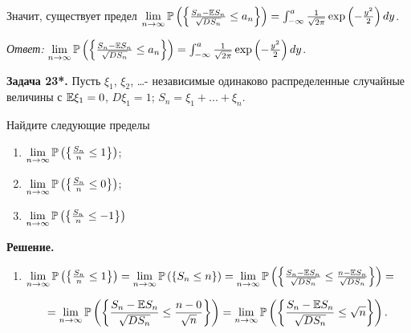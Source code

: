 Значит, существует предел $\mathop{\lim }\limits_{n\to \infty } {\rm {\mathbb P}}\left(\left\{\frac{S_{n} -{\rm {\mathbb E}}S_{n} }{\sqrt{DS_{n} } } \le a_{n} \right\}\right)=\int _{-\infty }^{a}{\tfrac{1}{\sqrt{2\pi } }} \exp \left(-{\tfrac{y^{2} }{2}} \right)dy $.

\textit{Ответ: }$\mathop{\lim }\limits_{n\to \infty } {\rm {\mathbb P}}\left(\left\{\frac{S_{n} -{\rm {\mathbb E}}S_{n} }{\sqrt{DS_{n} } } \le a_{n} \right\}\right)=\int _{-\infty }^{a}{\tfrac{1}{\sqrt{2\pi } }} \exp \left(-{\tfrac{y^{2} }{2}} \right)dy $.



\textbf{Задача 23*.} Пусть $\xi _{1} $, $\xi _{2} $, \dots  - независимые одинаково распределенные случайные величины с ${\rm {\mathbb E}}\xi _{1} =0$, $D\xi _{1} =1$; $S_{n} =\xi _{1} +...+\xi _{n} $. 

Найдите следующие пределы 

\begin{enumerate}
\item  $\mathop{\lim }\limits_{n\to \infty } {\rm {\mathbb P}}\left(\left\{\frac{S_{n} }{n} \le 1\right\}\right)$;

\item  $\mathop{\lim }\limits_{n\to \infty } {\rm {\mathbb P}}\left(\left\{\frac{S_{n} }{n} \le 0\right\}\right)$;

\item  $\mathop{\lim }\limits_{n\to \infty } {\rm {\mathbb P}}\left(\left\{\frac{S_{n} }{n} \le -1\right\}\right)$
\end{enumerate}

\textbf{Решение.}

\begin{enumerate}
\item \textbf{ }$\mathop{\lim }\limits_{n\to \infty } {\rm {\mathbb P}}\left(\left\{\frac{S_{n} }{n} \le 1\right\}\right)=\mathop{\lim }\limits_{n\to \infty } {\rm {\mathbb P}}\left(\left\{S_{n} \le n\right\}\right)=\mathop{\lim }\limits_{n\to \infty } {\rm {\mathbb P}}\left(\left\{\frac{S_{n} -{\rm {\mathbb E}}S_{n} }{\sqrt{DS_{n} } } \le \frac{n-{\rm {\mathbb E}}S_{n} }{\sqrt{DS_{n} } } \right\}\right)=$

\[=\mathop{\lim }\limits_{n\to \infty } {\rm {\mathbb P}}\left(\left\{\frac{S_{n} -{\rm {\mathbb E}}S_{n} }{\sqrt{DS_{n} } } \le \frac{n-0}{\sqrt{n} } \right\}\right)=\mathop{\lim }\limits_{n\to \infty } {\rm {\mathbb P}}\left(\left\{\frac{S_{n} -{\rm {\mathbb E}}S_{n} }{\sqrt{DS_{n} } } \le \sqrt{n} \right\}\right).\] 
\end{enumerate}

